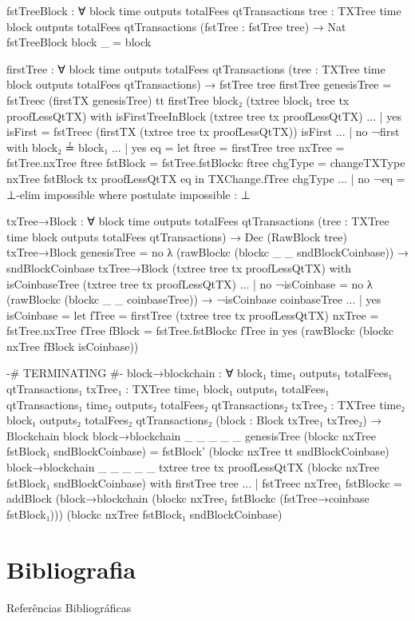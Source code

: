 \documentclass{beamer}
\begin{document}
\begin{code}
    fstTreeBlock : ∀
      {block time outputs totalFees qtTransactions}
      {tree : TXTree time block outputs totalFees qtTransactions}
      (fstTree : fstTree tree)
      → Nat
    fstTreeBlock {block} _ = block

    firstTree : ∀
      {block time outputs totalFees qtTransactions}
      (tree : TXTree time block outputs totalFees qtTransactions)
      → fstTree tree
    firstTree genesisTree = fstTreec (firstTX genesisTree) tt
    firstTree {block₂} (txtree {block₁} tree tx proofLessQtTX)
      with isFirstTreeInBlock (txtree tree tx proofLessQtTX)
    ... | yes isFirst = fstTreec (firstTX (txtree tree tx proofLessQtTX)) isFirst
    ... | no ¬first with block₂ ≟ block₁
    ...   | yes eq = let ftree = firstTree tree
                         nxTree = fstTree.nxTree ftree
                         fstBlock = fstTree.fstBlockc ftree
                         chgType = changeTXType nxTree fstBlock tx proofLessQtTX eq
                    in TXChange.fTree chgType
    ...   | no ¬eq = ⊥-elim impossible
              where postulate impossible : ⊥

    txTree→Block : ∀
      {block time outputs totalFees qtTransactions}
      (tree : TXTree time block outputs totalFees qtTransactions)
      → Dec (RawBlock tree)
    txTree→Block genesisTree =
      no λ { (rawBlockc (blockc _ _ sndBlockCoinbase)) → sndBlockCoinbase }
    txTree→Block (txtree tree tx proofLessQtTX)
      with isCoinbaseTree (txtree tree tx proofLessQtTX)
    ... | no ¬isCoinbase =
            no λ{ (rawBlockc (blockc _ _ coinbaseTree)) → ¬isCoinbase coinbaseTree}
    ... | yes isCoinbase = let fTree = firstTree (txtree tree tx proofLessQtTX)
                               nxTree = fstTree.nxTree fTree
                               fBlock = fstTree.fstBlockc fTree
                          in yes (rawBlockc (blockc nxTree fBlock isCoinbase))

    {-# TERMINATING #-}
    block→blockchain : ∀
      {block₁ time₁ outputs₁ totalFees₁ qtTransactions₁}
      {txTree₁ : TXTree time₁ block₁ outputs₁ totalFees₁ qtTransactions₁}
      {time₂ outputs₂ totalFees₂ qtTransactions₂}
      {txTree₂ : TXTree time₂ block₁ outputs₂ totalFees₂ qtTransactions₂}
      (block : Block txTree₁ txTree₂)
      → Blockchain block
    block→blockchain {_} {_} {_} {_} {_} {genesisTree}
      (blockc nxTree fstBlock₁ sndBlockCoinbase) =
      fstBlock' (blockc nxTree tt sndBlockCoinbase)
    block→blockchain {_} {_} {_} {_} {_} {txtree tree tx proofLessQtTX}
      (blockc nxTree fstBlock₁ sndBlockCoinbase)
      with firstTree tree
    ... | fstTreec nxTree₁ fstBlockc = addBlock
      (block→blockchain (blockc nxTree₁ fstBlockc (fstTree→coinbase fstBlock₁)))
      (blockc nxTree fstBlock₁ sndBlockCoinbase)
\end{code}





\section{Bibliografia}

\begin{frame}{Referências Bibliográficas}
  
  
\end{frame}
\end{document}
